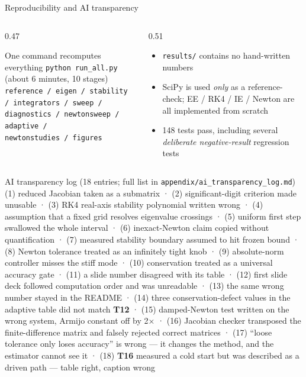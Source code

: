 \documentclass[aspectratio=169,10pt]{beamer}
\newcommand{\tab}[1]{\textbf{#1}}
\newcommand{\code}[1]{\texttt{\small #1}}
\begin{document}
\begin{frame}{Reproducibility and AI transparency}
  \begin{columns}[T]
    \begin{column}{0.47\textwidth}
      \begin{block}{One command recomputes everything}
        \footnotesize
        \code{python run\_all.py} (about 6 minutes, 10 stages)\\[0.15em]
        \code{reference / eigen / stability / integrators / sweep /}\\
        \code{diagnostics / newtonsweep / adaptive /}\\
        \code{newtonstudies / figures}
      \end{block}
    \end{column}
    \begin{column}{0.51\textwidth}
      \begin{itemize}
        \item \code{results/} contains \alert{no hand-written numbers}
        \item SciPy is used \emph{only} as a reference-check;
              EE / RK4 / IE / Newton are all \alert{implemented from scratch}
        \item 148 tests pass, including several \emph{deliberate negative-result}
              regression tests
      \end{itemize}
    \end{column}
  \end{columns}

  \vspace{0.2em}
  \begin{block}{AI transparency log (18 entries; full list in \code{appendix/ai\_transparency\_log.md})}
    \scriptsize
    (1) reduced Jacobian taken as a submatrix  ·  (2) significant-digit criterion made unusable  ·
    (3) RK4 real-axis stability polynomial written wrong  ·  (4) assumption that a fixed grid resolves eigenvalue crossings  ·
    (5) uniform first step swallowed the whole interval  ·  (6) inexact-Newton claim copied without quantification  ·
    (7) measured stability boundary assumed to hit frozen bound  ·  (8) Newton tolerance treated as an infinitely tight knob  ·
    (9) absolute-norm controller misses the stiff mode  ·  (10) conservation treated as a universal accuracy gate  ·
    \alert{(11) a slide number disagreed with its table}  ·
    \alert{(12) first slide deck followed computation order and was unreadable}  ·
    \alert{(13) the same wrong number stayed in the README}  ·
    (14) three conservation-defect values in the adaptive table did not match \tab{T12}  ·
    \alert{(15) damped-Newton test written on the wrong system, Armijo constant off by 2×}  ·
    \alert{(16) Jacobian checker transposed the finite-difference matrix and falsely rejected correct matrices}  ·
    \alert{(17) ``loose tolerance only loses accuracy'' is wrong --- it changes the method, and the estimator cannot see it}  ·
    \alert{(18) \tab{T16} measured a cold start but was described as a driven path --- table right, caption wrong}


\end{block}
\end{frame}
\end{document}
